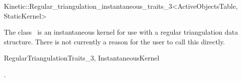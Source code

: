 

\begin{ccRefClass}{Kinetic::Regular_triangulation_instantaneous_traits_3<ActiveObjectsTable, StaticKernel>}  %


\ccDefinition
  
The class \ccRefName\ is an instantaneous kernel for use with a
regular triangulation data structure. There is not currently a reason
for the user to call this directly.


\ccIsModel

RegularTriangulationTraits\_3, InstantaneousKernel

\ccSeeAlso

.

\ccExample


\end{ccRefClass}


